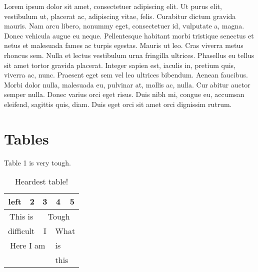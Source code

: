 \documentclass{article}
\begin{document}
Lorem ipsum dolor sit amet, consectetuer adipiscing elit. Ut purus elit,
vestibulum ut, placerat ac, adipiscing vitae, felis. Curabitur dictum gravida
mauris. Nam arcu libero, nonummy eget, consectetuer id, vulputate a, magna.
Donec vehicula augue eu neque. Pellentesque habitant morbi tristique senectus
et netus et malesuada fames ac turpis egestas. Mauris ut leo. Cras viverra
metus rhoncus sem. Nulla et lectus vestibulum urna fringilla ultrices. Phasellus
eu tellus sit amet tortor gravida placerat. Integer sapien est, iaculis in, pretium
quis, viverra ac, nunc. Praesent eget sem vel leo ultrices bibendum. Aenean
faucibus. Morbi dolor nulla, malesuada eu, pulvinar at, mollis ac, nulla. Curabitur auctor semper nulla. Donec varius orci eget risus. Duis nibh mi, congue
eu, accumsan eleifend, sagittis quis, diam. Duis eget orci sit amet orci dignissim
rutrum. \\

\section*{Tables}
Table 1 is very tough.
\begin{table}[h]
    \centering
    \begin{tabular}{|c|c|c|c|c|}
        \hline
        left & 2 & 3 & 4 & 5 \\
        \hline
        \multicolumn{2}{c}{This is} & \multicolumn{3}{c}{Tough} \\
        \cline{3-5}
        \multicolumn{2}{c}{difficult} & I & \multicolumn{2}{|c|}{What}\\
        \cline{1-3}
        \multicolumn{3}{|c|}{Here I am} & \multicolumn{2}{|l|}{is}\\
        \hline
        \multicolumn{3}{c}{} & \multicolumn{2}{l}{this}\\
    \end{tabular}
    \caption{ Heardest table!}
    \label{tab:my_label}
\end{table}
\end{document}
